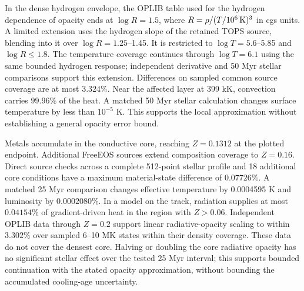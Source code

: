 \documentclass[11pt,letterpaper]{article}
\begin{document}
In the dense hydrogen envelope, the OPLIB table used for the hydrogen
dependence of opacity ends at $\log R=1.5$, where
$R=\rho/(T/10^6\,{\rm K})^3$ in cgs units. A limited extension uses the
hydrogen slope of the retained TOPS source, blending into it over
$\log R=1.25$--1.45. It is restricted to $\log T=5.6$--5.85 and
$\log R\leq1.8$. The temperature coverage continues through
$\log T=6.1$ using the same bounded hydrogen response; independent
derivative and 50 Myr stellar comparisons support this extension. Differences on sampled common source coverage are at
most $3.324\%$. Near the affected layer at 399 kK, convection carries
$99.96\%$ of the heat. A matched 50 Myr stellar calculation changes
surface temperature by less than $10^{-5}$ K. This supports the local
approximation without establishing a general opacity error bound.



Metals accumulate in the conductive core, reaching $Z=0.1312$ at the
plotted endpoint. Additional FreeEOS sources extend composition coverage
to $Z=0.16$. Direct source checks across a complete 512-point stellar profile and
18 additional core conditions have a maximum material-state difference
of $0.07726\%$. A matched 25 Myr comparison changes effective temperature
by 0.0004595 K and luminosity by $0.0002080\%$.
In a model on the track, radiation supplies at most $0.04154\%$ of
gradient-driven heat in the region with $Z>0.06$. Independent OPLIB data through $Z=0.2$ support
linear radiative-opacity scaling to within $3.302\%$ over sampled
6--10 MK states within their density coverage. These data do not cover
the densest core. Halving or doubling the core radiative opacity has
no significant stellar effect over the tested 25 Myr interval; this
supports bounded continuation with the stated opacity approximation,
without bounding the accumulated cooling-age uncertainty.
\end{document}
